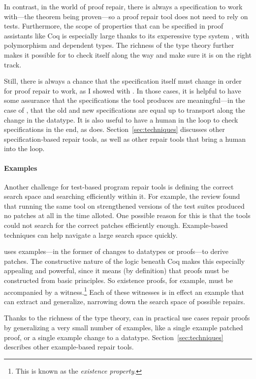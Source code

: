 In contrast, in the world of proof repair, there is always a specification to work with---the theorem being proven---so
a proof repair tool does not need to rely on tests.
Furthermore, the scope of properties that can be specified in proof assistants like Coq is especially large thanks to its experessive type system ,
with polymorphism and dependent types.
The richness of the type theory further makes it possible for \sysnamelong to check itself along the way and make sure it is on the right track.

Still, there is always a chance that the specification itself must change in order for proof repair to work,
as I showed with \toolnamec.
In those cases, it is helpful to have some assurance that the specifications the tool produces are meaningful---in the case of
\toolnamec, that the old and new specifications are equal up to transport along the change in the datatype.
It is also useful to have a human in the loop to check specifications in the end,
as \toolnamec does.
Section~\ref{sec:techniques} discusses other specification-based repair tools,
as well as other repair tools that bring a human into the loop.

\paragraph{Examples}
Another challenge for test-based program repair tools is defining the correct search space and searching efficiently within it.
For example, the review found that running the same tool on strengthened versions of the test suites produced no patches at all in the time alloted.
One possible reason for this is that the tools could not search for the correct patches efficiently enough.
Example-based techniques can help navigate a large search space quickly.

\sysnamelong uses examples---in the former of changes to datatypes or proofs---to derive patches.
The constructive nature of the logic  beneath Coq makes this especially appealing and powerful,
since it means (by definition) that proofs must be constructed from basic principles.
So existence proofs, for example, must be accompanied by a witness.\footnote{This is known as the \textit{existence property}.}
Each of these witnesses is in effect an example that \sysnamelong can extract and generalize,
narrowing down the search space of possible repairs.

Thanks to the richness of the type theory, \sysnamelong can in practical use cases repair proofs by generalizing a very small number of examples,
like a single example patched proof, or a single example change to a datatype.
Section~\ref{sec:techniques} describes other example-based repair tools.

